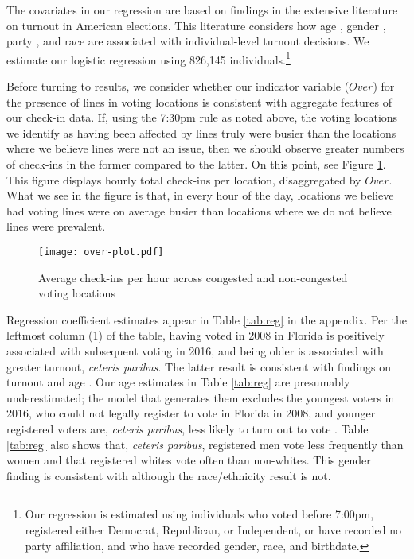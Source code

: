 \documentclass[12pt,titlepage]{article}
\begin{document}
The covariates in our regression are based on findings in the
extensive literature on turnout in American elections. This literature
considers how age \citep{strateetal:age,hightonwolfinger:lifecycle},
gender \citep{schlozman:genderdifferentvoice}, party
\citep{martinezgill:partisanturnout,grofmanetal:turnout}, and race
\citep{verbaetal:raceparticipation,fraga:raceturnout} are associated
with individual-level turnout decisions. We estimate our logistic
regression using 826,145 individuals.\footnote{Our regression is
  estimated using individuals who voted before 7:00pm, registered
  either Democrat, Republican, or Independent, or have recorded no
  party affiliation, and who have recorded gender, race, and
  birthdate.}

Before turning to results, we consider whether our indicator variable
($Over$) for the presence of lines in voting locations is consistent
with aggregate features of our check-in data. If, using the 7:30pm
rule as noted above, the voting locations we identify as having been
affected by lines truly were busier than the locations where we
believe lines were not an issue, then we should observe greater
numbers of check-ins in the former compared to the latter. On this
point, see Figure \ref{fig:overplot}. This figure displays hourly total check-ins
per location, disaggregated by $Over$. What we see in the figure is
that, in every hour of the day, locations we believe had voting lines
were on average busier than locations where we do not believe lines were
prevalent.%

\begin{figure}[!ht]
  \caption{Average check-ins per hour across congested and non-congested
    voting locations}
  \label{fig:overplot}
  \centering
    \centering\texttt{[image: over-plot.pdf]}
\end{figure}

Regression coefficient estimates appear in Table \ref{tab:reg} in the
appendix. Per the leftmost column (1) of the table, having voted in
2008 in Florida is positively associated with subsequent voting in
2016, and being older is associated with greater turnout,
\emph{ceteris paribus}. The latter result is consistent with findings
on turnout and age \citep{costaetal:walkingthewalk}. Our age estimates
in Table \ref{tab:reg} are presumably underestimated; the model that
generates them excludes the youngest voters in 2016, who could not
legally register to vote in Florida in 2008, and younger registered
voters are, \emph{ceteris paribus}, less likely to turn out to vote
\citep{shinosmith:registrationtiming}. Table \ref{tab:reg} also shows
that, \emph{ceteris paribus}, registered men vote less frequently than
women and that registered whites vote often than non-whites. This
gender finding is consistent with \citet{leighleynagler:whovotesnow}
although the race/ethnicity result is not.
\end{document}

